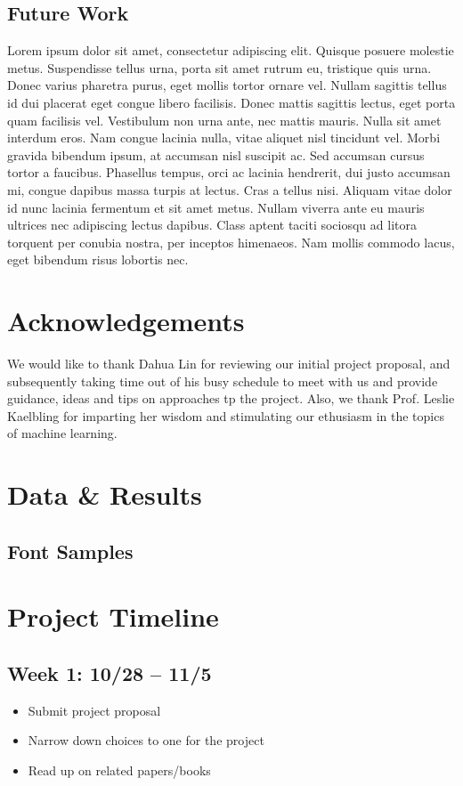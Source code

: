 \documentclass[12pt]{article}
\begin{document}
	\subsection{Future Work}
	Lorem ipsum dolor sit amet, consectetur adipiscing elit. Quisque posuere molestie metus. Suspendisse tellus urna, porta sit amet rutrum eu, tristique quis urna. Donec varius pharetra purus, eget mollis tortor ornare vel. Nullam sagittis tellus id dui placerat eget congue libero facilisis. Donec mattis sagittis lectus, eget porta quam facilisis vel. Vestibulum non urna ante, nec mattis mauris. Nulla sit amet interdum eros. Nam congue lacinia nulla, vitae aliquet nisl tincidunt vel. Morbi gravida bibendum ipsum, at accumsan nisl suscipit ac. Sed accumsan cursus tortor a faucibus. Phasellus tempus, orci ac lacinia hendrerit, dui justo accumsan mi, congue dapibus massa turpis at lectus. Cras a tellus nisi. Aliquam vitae dolor id nunc lacinia fermentum et sit amet metus. Nullam viverra ante eu mauris ultrices nec adipiscing lectus dapibus. Class aptent taciti sociosqu ad litora torquent per conubia nostra, per inceptos himenaeos. Nam mollis commodo lacus, eget bibendum risus lobortis nec.

\section{Acknowledgements}
	We would like to thank Dahua Lin for reviewing our initial project proposal, and subsequently taking time out of his busy schedule to meet with us and provide guidance, ideas and tips on approaches tp the project. Also, we thank Prof. Leslie Kaelbling for imparting her wisdom and stimulating our ethusiasm in the topics of machine learning. 
	 
\appendix
	\section{Data \& Results}
		\subsection{Font Samples}
		\label{appendix:data:font}
	\section{Project Timeline}
		\subsection*{Week 1: 10/28 -- 11/5 }
			\begin{itemize}
				\item{Submit project proposal}
				\item{Narrow down choices to one for the project}
				\item{Read up on related papers/books}
			\end{itemize}
\end{document}
